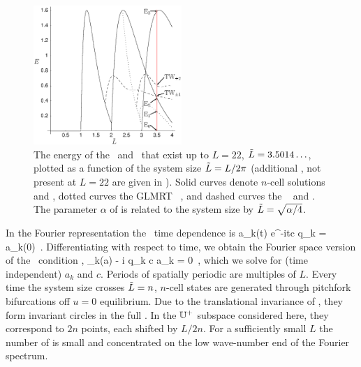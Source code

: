 \begin{figure}[t]       \label{fig:ksBifDiag}
\begin{center}
\includegraphics[width=0.5\textwidth]{figs/ksBifDiag_pst.eps}
\end{center}
\caption{
The energy  of the \eqva\ and \reqva\ that
exist up to $L=22$, $\tilde{L} = 3.5014\ldots$, plotted as a function
of the system size $\tilde{L} = L/2\pi$ (additional \eqva, not present
at $L = 22$ are given in ). Solid curves denote
$n$-cell solutions  and , dotted curves the GLMRT
\eqv\ ,
and dashed curves the \reqva\  and .
The parameter $\alpha$ of  is
related to the system size by $\tilde{L}=\sqrt{\alpha/4}$.
        }
\end{figure}

In the Fourier representation the \reqva\ time
dependence is
\beq
 a_k(t) e^{-itc q_k} = a_k(0)
\,.
Differentiating with respect to time, we obtain
the Fourier space version of the \reqv\ condition
,
\beq
 \pVeloc_k(a) - i q_k c a_k = 0
\,,
which we solve for (time independent) $a_k$ and $c$.
Periods of spatially periodic {\eqva} are multiples of $L$.
Every time the system size crosses  $\tilde{L}=n$,
$n$-cell states
are generated through pitchfork bifurcations off $u =0$
equilibrium.
Due to the translational invariance of {\KSe},
they form invariant circles
in the full \statesp.
In the $\mathbb{U}^+$ subspace considered here,
they correspond to $2n$ points, each shifted by $L/2n$.
For a sufficiently small $L$
the number of {\eqva} is small and
concentrated on the low wave-number end of the Fourier spectrum.

